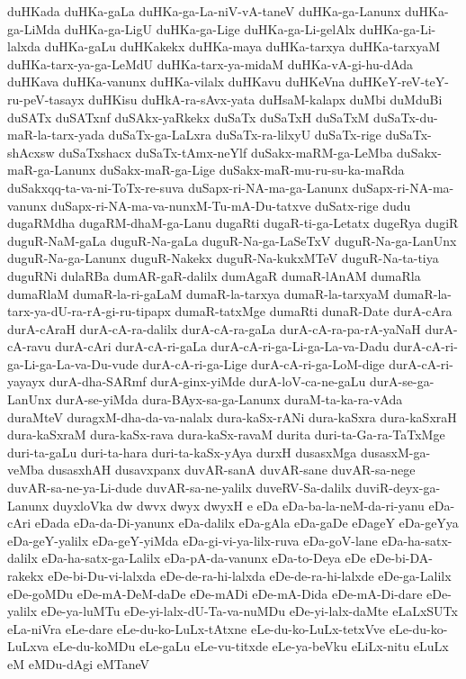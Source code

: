 {duHKada
duHKa-gaLa
duHKa-ga-La-niV-vA-taneV
duHKa-ga-Lanunx
duHKa-ga-LiMda
duHKa-ga-LigU
duHKa-ga-Lige
duHKa-ga-Li-gelAlx
duHKa-ga-Li-lalxda
duHKa-gaLu
duHKakekx
duHKa-maya
duHKa-tarxya
duHKa-tarxyaM
duHKa-tarx-ya-ga-LeMdU
duHKa-tarx-ya-midaM
duHKa-vA-gi-hu-dAda
duHKava
duHKa-vanunx
duHKa-vilalx
duHKavu
duHKeVna
duHKeY-reV-teY-ru-peV-tasayx
duHKisu
duHkA-ra-sAvx-yata
duHsaM-kalapx
duMbi
duMduBi
duSATx
duSATxnf
duSAkx-yaRkekx
duSaTx
duSaTxH
duSaTxM
duSaTx-du-maR-la-tarx-yada
duSaTx-ga-LaLxra
duSaTx-ra-lilxyU
duSaTx-rige
duSaTx-shAcxsw
duSaTxshacx
duSaTx-tAmx-neYlf
duSakx-maRM-ga-LeMba
duSakx-maR-ga-Lanunx
duSakx-maR-ga-Lige
duSakx-maR-mu-ru-su-ka-maRda
duSakxqq-ta-va-ni-ToTx-re-suva
duSapx-ri-NA-ma-ga-Lanunx
duSapx-ri-NA-ma-vanunx
duSapx-ri-NA-ma-va-nunxM-Tu-mA-Du-tatxve
duSatx-rige
dudu
dugaRMdha
dugaRM-dhaM-ga-Lanu
dugaRti
dugaR-ti-ga-Letatx
dugeRya
dugiR
duguR-NaM-gaLa
duguR-Na-gaLa
duguR-Na-ga-LaSeTxV
duguR-Na-ga-LanUnx
duguR-Na-ga-Lanunx
duguR-Nakekx
duguR-Na-kukxMTeV
duguR-Na-ta-tiya
duguRNi
dulaRBa
dumAR-gaR-dalilx
dumAgaR
dumaR-lAnAM
dumaRla
dumaRlaM
dumaR-la-ri-gaLaM
dumaR-la-tarxya
dumaR-la-tarxyaM
dumaR-la-tarx-ya-dU-ra-rA-gi-ru-tipapx
dumaR-tatxMge
dumaRti
dunaR-Date
durA-cAra
durA-cAraH
durA-cA-ra-dalilx
durA-cA-ra-gaLa
durA-cA-ra-pa-rA-yaNaH
durA-cA-ravu
durA-cAri
durA-cA-ri-gaLa
durA-cA-ri-ga-Li-ga-La-va-Dadu
durA-cA-ri-ga-Li-ga-La-va-Du-vude
durA-cA-ri-ga-Lige
durA-cA-ri-ga-LoM-dige
durA-cA-ri-yayayx
durA-dha-SARmf
durA-ginx-yiMde
durA-loV-ca-ne-gaLu
durA-se-ga-LanUnx
durA-se-yiMda
dura-BAyx-sa-ga-Lanunx
duraM-ta-ka-ra-vAda
duraMteV
duragxM-dha-da-va-nalalx
dura-kaSx-rANi
dura-kaSxra
dura-kaSxraH
dura-kaSxraM
dura-kaSx-rava
dura-kaSx-ravaM
durita
duri-ta-Ga-ra-TaTxMge
duri-ta-gaLu
duri-ta-hara
duri-ta-kaSx-yAya
durxH
dusasxMga
dusasxM-ga-veMba
dusasxhAH
dusavxpanx
duvAR-sanA
duvAR-sane
duvAR-sa-nege
duvAR-sa-ne-ya-Li-dude
duvAR-sa-ne-yalilx
duveRV-Sa-dalilx
duviR-deyx-ga-Lanunx
duyxloVka
dw
dwvx
dwyx
dwyxH
e
eDa
eDa-ba-la-neM-da-ri-yanu
eDa-cAri
eDada
eDa-da-Di-yanunx
eDa-dalilx
eDa-gAla
eDa-gaDe
eDageY
eDa-geYya
eDa-geY-yalilx
eDa-geY-yiMda
eDa-gi-vi-ya-lilx-ruva
eDa-goV-lane
eDa-ha-satx-dalilx
eDa-ha-satx-ga-Lalilx
eDa-pA-da-vanunx
eDa-to-Deya
eDe
eDe-bi-DA-rakekx
eDe-bi-Du-vi-lalxda
eDe-de-ra-hi-lalxda
eDe-de-ra-hi-lalxde
eDe-ga-Lalilx
eDe-goMDu
eDe-mA-DeM-daDe
eDe-mADi
eDe-mA-Dida
eDe-mA-Di-dare
eDe-yalilx
eDe-ya-luMTu
eDe-yi-lalx-dU-Ta-va-nuMDu
eDe-yi-lalx-daMte
eLaLxSUTx
eLa-niVra
eLe-dare
eLe-du-ko-LuLx-tAtxne
eLe-du-ko-LuLx-tetxVve
eLe-du-ko-LuLxva
eLe-du-koMDu
eLe-gaLu
eLe-vu-titxde
eLe-ya-beVku
eLiLx-nitu
eLuLx
eM
eMDu-dAgi
eMTaneV
}
